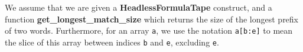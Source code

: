 \begin{remark}
    We assume that we are given a \textbf{HeadlessFormulaTape} construct, and a function \textbf{get\_longest\_match\_size} which returns the size of the longest prefix of two words. Furthermore, for an array \texttt{a}, we use the notation \texttt{a[b:e]} to mean the slice of this array between indices \texttt{b} and \texttt{e}, excluding \texttt{e}.
\end{remark}





